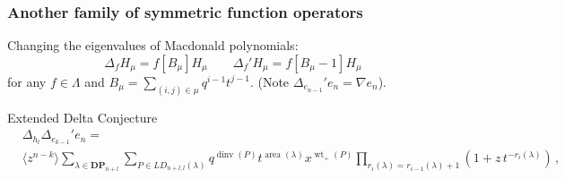 \documentclass{beamer}
\newcommand{\sym}{\Lambda}
\DeclareMathOperator{\area}{area}
\DeclareMathOperator{\dinv}{dinv}
\newcommand{\DP}{\mathbf{DP}}
\newcommand{\Dyck}{\DP}
\newcommand{\LD}{LD}
\DeclareMathOperator{\wt}{wt}
\begin{document}
\begin{frame}
  \frametitle{Another family of symmetric function operators}
  Changing the eigenvalues of Macdonald polynomials:\[
    \Delta_f H_\mu = f[B_\mu]H_\mu \quad \quad \Delta_f' H_\mu = f[B_\mu-1] H_\mu
  \]
  for any \(f \in \sym\) and \(B_\mu = \sum_{(i,j) \in \mu} q^{i-1} t^{j-1}\). (Note
  \(\Delta_{e_{n-1}}' e_n = \nabla e_n\)). \pause
  \begin{block}{Extended Delta Conjecture}
    \begin{align*}
      & \Delta_{h_l} \Delta_{e_{k-1}}' e_n =
      \\ & \langle z^{n-k}\rangle
\sum_{\lambda \in \Dyck_{n+l}} \sum_{P\in\LD_{n+l,l}(\lambda)}
q^{\dinv(P)}t^{\area(\lambda)} x^{\wt_+(P)}
\prod_{r_{i}(\lambda)=r_{i-1}(\lambda)+1} \left(1+ z\,
t^{-r_i(\lambda)}\right) \,,
    \end{align*}
  \end{block}
\end{frame}
\end{document}
